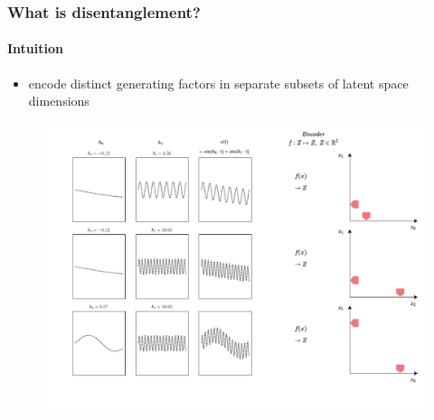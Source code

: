 \documentclass[9pt]{beamer}
\begin{document}
\begin{frame}
\frametitle{What is disentanglement?}
\framesubtitle{Intuition}
	\begin{itemize}%
	\item encode distinct generating factors in separate subsets of latent space dimensions
	\end{itemize}
\begin{figure}
	\includegraphics[width=.95\linewidth]{figures/intution_3x3.pdf}
\end{figure}
\end{frame} 
\end{document}
